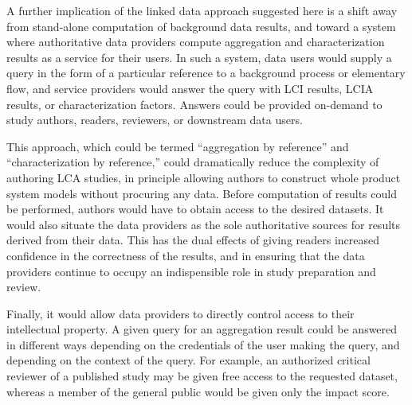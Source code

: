 A further implication of the linked data approach suggested here is a shift away from stand-alone computation of background data results, and toward a system where authoritative data providers compute aggregation and characterization results as a service for their users.  In such a system, data users would supply a query in the form of a particular reference to a background process or elementary flow, and service providers would answer the query with LCI results, LCIA results, or characterization factors.  Answers could be provided on-demand to study authors, readers, reviewers, or downstream data users.

This approach, which could be termed ``aggregation by reference'' and ``characterization by reference,'' could dramatically reduce the complexity of authoring LCA studies, in principle allowing authors to construct whole product system models without procuring any data.  Before computation of results could be performed, authors would have to obtain access to the desired datasets.  It would also situate the data providers as the sole authoritative sources for results derived from their data.  This has the dual effects of giving readers increased confidence in the correctness of the results, and in ensuring that the data providers continue to occupy an indispensible role in study preparation and review.

Finally, it would allow data providers to directly control access to their intellectual property.  A given query for an aggregation result could be answered in different ways depending on the credentials of the user making the query, and depending on the context of the query.  For example, an authorized critical reviewer of a published study may be given free access to the requested dataset, whereas a member of the general public would be given only the impact score.

\endinput






If a publication includes LCIA results, then a reader with access to the same background database used by the author can validate the scores by computing the unit impact scores for background datasets referenced in the publication.  It may also be possible for the author to publish unit impact scores for background processes without violating licensing terms, in which case the reader can check the scores for accuracy.


